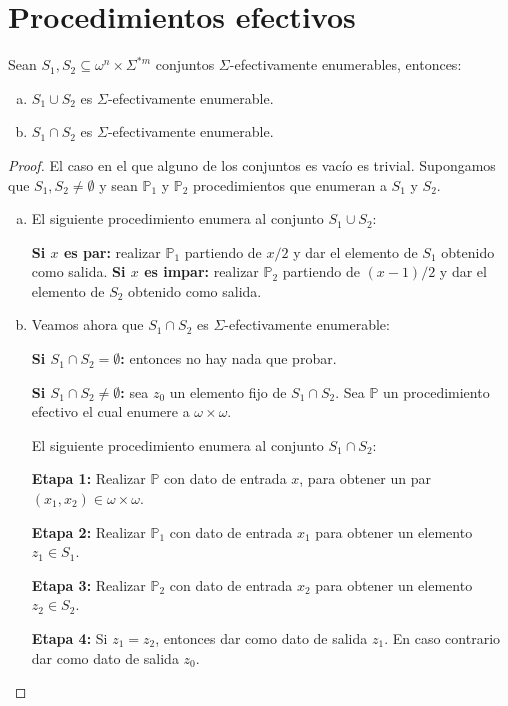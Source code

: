 \section{Procedimientos efectivos}

  \begin{lemma}
    \PN Sean $S_{1}, S_{2} \subseteq \omega^{n} \times \Sigma^{\ast m}$ conjuntos $\Sigma$-efectivamente enumerables,
    entonces:

    \begin{enumerate}[a)]
      \item $S_{1} \cup S_{2}$ es $\Sigma$-efectivamente enumerable.
      \item $S_{1} \cap S_{2}$ es $\Sigma$-efectivamente enumerable.
    \end{enumerate}
  \end{lemma}
  \begin{proof}
    \PN El caso en el que alguno de los conjuntos es vacío es trivial. Supongamos que $S_{1}, S_{2} \neq \emptyset$ y
    sean $\mathbb{P}_{1}$ y $\mathbb{P}_{2}$ procedimientos que enumeran a $S_{1}$ y $S_{2}$.

    \begin{enumerate}[a)]
      \item El siguiente procedimiento enumera al conjunto $S_{1} \cup S_{2}$:

        \textbf{Si $x$ es par:} realizar $\mathbb{P}_{1}$ partiendo de $x/2$ y dar el elemento de $S_{1}$ obtenido como
        salida.
        \textbf{Si $x$ es impar:} realizar $\mathbb{P}_{2}$ partiendo de $(x-1)/2$ y dar el elemento de $S_{2}$ obtenido
        como salida.

      \item Veamos ahora que $S_{1} \cap S_{2}$ es $\Sigma$-efectivamente enumerable:

        \textbf{Si $S_{1} \cap S_{2} = \emptyset$:} entonces no hay nada que probar.

        \textbf{Si $S_{1} \cap S_{2} \neq \emptyset$:} sea $z_{0}$ un elemento fijo de $S_{1} \cap S_{2}$. Sea
        $\mathbb{P}$ un procedimiento efectivo el cual enumere a $\omega \times \omega$.

        \vspace{3mm}
        \PN El siguiente procedimiento enumera al conjunto $S_{1} \cap S_{2}$:

        \PN \textbf{Etapa 1:}
        Realizar $\mathbb{P}$ con dato de entrada $x$, para obtener un par $(x_{1}, x_{2}) \in \omega \times \omega $.

        \PN \textbf{Etapa 2:}
        Realizar $\mathbb{P}_{1}$ con dato de entrada $x_{1}$ para obtener un elemento $z_{1} \in S_{1}$.

        \PN \textbf{Etapa 3:}
        Realizar $\mathbb{P}_{2}$ con dato de entrada $x_{2}$ para obtener un elemento $z_{2} \in S_{2}$.

        \PN \textbf{Etapa 4:}
        Si $z_{1} = z_{2}$, entonces dar como dato de salida $z_{1}$. En caso contrario dar como dato de salida $z_{0}$.
    \end{enumerate}
  \end{proof}

